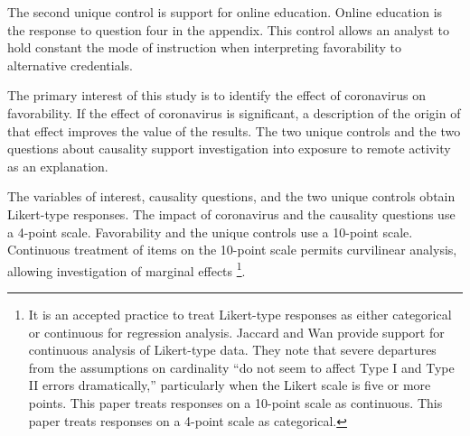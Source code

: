 \documentclass[review]{elsarticle}
\begin{document}
The second unique control is support for online education.
Online education is the response to question four in the appendix.
This control allows an analyst to hold constant the mode of instruction when interpreting favorability to alternative credentials.

The primary interest of this study is to identify the effect of coronavirus on favorability.
If the effect of coronavirus is significant, a description of the origin of that effect improves the value of the results.
The two unique controls and the two questions about causality support investigation into exposure to remote activity as an explanation.

The variables of interest,
causality questions,
and the two unique controls obtain Likert-type responses.
The impact of coronavirus and the causality questions use a 4-point scale.
Favorability and the unique controls use a 10-point scale.
Continuous treatment of items on the 10-point scale permits curvilinear analysis,
allowing investigation of marginal effects
\footnote{
    It is an accepted practice to treat Likert-type responses as either categorical or continuous for regression analysis.
    Jaccard and Wan provide support for continuous analysis of Likert-type data.
    They note that severe departures from the assumptions on cardinality ``do not seem to affect Type I and Type II errors dramatically,''
    particularly when the Likert scale is five or more points\cite{jaccard1996lisrel}.
    This paper treats responses on a 10-point scale as continuous.
    This paper treats responses on a 4-point scale as categorical.
}.
\end{document}
